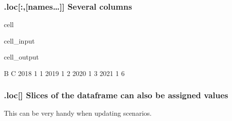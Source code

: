 \documentclass[letterpaper,10pt,english]{jupyterBook}
\begin{document}
\subsubsection{.loc{[}:,{[}names…{]}{]} Several columns}
\label{\detokenize{content/notebooks/pandas/dataframes:loc-names-several-columns}}
\begin{sphinxuseclass}{cell}\begin{sphinxVerbatimInput}

\begin{sphinxuseclass}{cell_input}
\begin{sphinxVerbatim}[commandchars=\\\{\}]
\PYG{p}{[}\PYG{p}{[}\PYG{p}{]}\PYG{p}{]}
\end{sphinxVerbatim}

\end{sphinxuseclass}\end{sphinxVerbatimInput}
\begin{sphinxVerbatimOutput}

\begin{sphinxuseclass}{cell_output}
\begin{sphinxVerbatim}[commandchars=\\\{\}]
      B  C
2018  1  1
2019  1  2
2020  1  3
2021  1  6
\end{sphinxVerbatim}

\end{sphinxuseclass}\end{sphinxVerbatimOutput}

\end{sphinxuseclass}

\subsubsection{.loc{[}{]} Slices of the dataframe can also be assigned values}
\label{\detokenize{content/notebooks/pandas/dataframes:loc-slices-of-the-dataframe-can-also-be-assigned-values}}
\sphinxAtStartPar
This can be very handy when updating scenarios.
\end{document}
